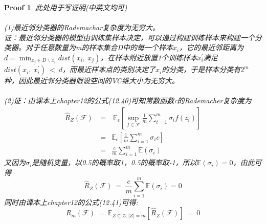 \documentclass[a4paper,UTF8]{article}
\numberwithin{equation}{section}
\newtheorem*{myProof}{Proof}
\begin{document}
\begin{myProof}
此处用于写证明(中英文均可)\\\\
(1)最近邻分类器的Rademachar复杂度为无穷大。\\
证：最近邻分类器的模型由训练集样本决定，可以通过构建训练样本来构建一个分类器。对于任意数量为m的样本集合D中的每一个样本$x_i$，它的最近邻距离为$d=\min_{x_j \in D \backslash x_i}dist(x_i,\ x_j)$，在样本附近放置1个训练样本$x_i^{'}$满足$dist(x_i,\ x_i^{'})\ <\ d$，而最近样本点的类别决定了$x_i$的分类，于是样本分类有$2^m$种，因此最近邻分类器假设空间的VC维大小为无穷大。\\\\


\noindent
(2)证：由课本上chapter12的公式(12.40)可知常数函数c的Rademacher复杂度为
\begin{eqnarray*}
    \hat{R}_Z(\mathcal{F})\ &=&\ \mathbb{E}_\epsilon[\sup_{f \in \mathcal{F}}\frac{1}{m}\sum_{i=1}^m\sigma_if(z_i)]\\
    &=&\mathbb{E}_\epsilon[\frac{1}{m}\sum_{i=1}^m \sigma_i c]\\
    &=&\frac{c}{m}\sum_{i=1}^{m}\mathbb{E}(\sigma_i)
\end{eqnarray*}
又因为$\sigma_i$是随机变量，以0.5的概率取1，0.5的概率取-1，所以$\mathbb{E}(\sigma_i)=0$，由此可得
\begin{equation*}
    \hat{R}_Z(\mathcal{F})\ =\ \frac{c}{m}\sum_{i=1}^{m}\mathbb{E}(\sigma_i) = 0
\end{equation*}
同时由课本上chapter12的公式(12.41)可得:
\begin{equation*}
    R_m(\mathcal{F})\ =\ \mathbb{E}_{Z \subseteq \mathcal{Z}:|Z|=m}[\hat{R}_Z(\mathcal{F})]\ =\ 0
\end{equation*}
\\


\end{myProof}
\end{document}
